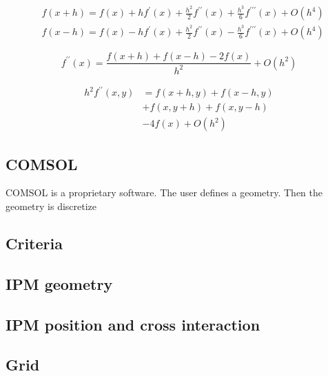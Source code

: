 \begin{refsection}
	\begin{align}
		 & f(x+h) = f(x)+hf^{\prime}(x)
		+\frac{h^2}{2}f^{\prime\prime}(x)+\frac{h^3}{6}f^{\prime\prime\prime}(x) + O(h^{4}) \\
		 & f(x-h) = f(x)-hf^{\prime}(x)
		+\frac{h^2}{2}f^{\prime\prime}(x)-\frac{h^3}{6}f^{\prime\prime\prime}(x) + O(h^{4})
	\end{align}

	\begin{equation}
		f^{\prime\prime}(x) = \frac{f(x+h) + f(x-h) - 2f(x)}{h^{2}} + O(h^{2})
	\end{equation}

	\begin{equation}
		\begin{split}
			h^{2}f^{\prime\prime}(x,y)&= f(x+h,y) + f(x-h,y) \\
			&+ f(x,y+h) + f(x,y-h) \\
			&- 4f(x)+ O(h^{2})
		\end{split}
	\end{equation}

	\subsection{COMSOL}
	COMSOL\cite{comsol2018} is a proprietary software.\cite{comsolacdc2018}
	The user defines a geometry.
	Then the geometry is discretize
	

	

	\cite{cststudio2018}\cite{ansys2018}\cite{couloumb2018}
	\subsection{Criteria}
	

	\subsection{IPM geometry}
	\subsection{IPM position and cross interaction}
	\subsection{Grid}

\end{refsection}
